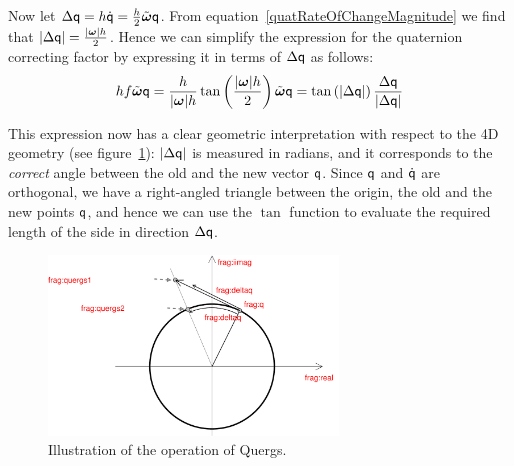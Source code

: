 Now let $\Delta \q{q} = h \dot{\q{q}} =
    \frac{h}{2} \tilde{\ve{\omega}} \q{q}$.
From equation~\ref{quatRateOfChangeMagnitude} we find that
$\norm{\Delta\q{q}} = \frac{\norm{\ve{\omega}} h}{2}$.
Hence we can simplify the expression for the quaternion correcting factor by expressing it
in terms of $\Delta \mathsf{q}$ as follows:
$$
h f \tilde{\ve{\omega}}\q{q} = \frac{h}{\norm{\ve{\omega}} h}
    \tan\left(\frac{\norm{\ve{\omega}} h}{2}\right) \tilde{\ve{\omega}} \q{q} =
    \tan\left(\norm{\Delta\q{q}}\right) \frac{\Delta\q{q}}{\norm{\Delta\q{q}}}
$$

This expression now has a clear geometric interpretation with respect to the 4D geometry
(see figure~\ref{quatIntFig2}):
$|\Delta\mathsf{q}|$ is measured in radians, and it corresponds to the \emph{correct}
angle between the old and the new vector $\mathsf{q}$. Since $\mathsf{q}$ and
$\dot{\mathsf{q}}$ are orthogonal, we have a right-angled triangle between the origin,
the old and the new points $\mathsf{q}$, and hence we can use the $\tan$ function to
evaluate the required length of the side in direction $\Delta\mathsf{q}$.

\begin{figure}
\centerline{\includegraphics[width=7.7cm]{figures/quaternion3}}
\caption{Illustration of the operation of Quergs.\label{quatIntFig2}}
\end{figure}

